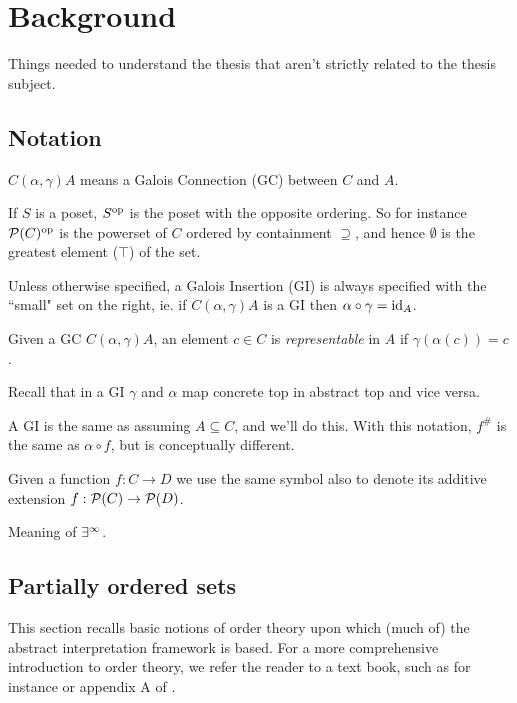 \chapter{Background}

Things needed to understand the thesis that aren't strictly related to the thesis subject.

\section{Notation}
$C (\alpha, \gamma) A$ means a Galois Connection (GC) between $C$ and $A$.

If $S$ is a poset, $S^{\text{op}}$ is the poset with the opposite ordering. So for instance $\mathcal{P}(C)^{\text{op}}$ is the powerset of $C$ ordered by containment $\supseteq$, and hence $\emptyset$ is the greatest element ($\top$) of the set.

Unless otherwise specified, a Galois Insertion (GI) is always specified with the ``small" set on the right, ie. if $C (\alpha, \gamma) A$ is a GI then $\alpha \circ \gamma = \text{id}_A$.

Given a GC $C (\alpha, \gamma) A$, an element $c \in C$ is \textit{representable} in $A$ if $\gamma(\alpha(c)) = c$.


Recall that in a GI $\gamma$ and $\alpha$ map concrete top in abstract top and vice versa.

A GI is the same as assuming $A \subseteq C$, and we'll do this. With this notation, $f^{\#}$ is the same as $\alpha \circ f$, but is conceptually different.

Given a function $f : C \rightarrow D$ we use the same symbol also to denote its additive extension $f: \mathcal{P}(C) \rightarrow \mathcal{P}(D)$.

Meaning of $\exists^{\infty}$.

\section{Partially ordered sets}
This section recalls basic notions of order theory upon which (much of) the abstract interpretation framework is based. For a more comprehensive introduction to order theory, we refer the reader to a text book, such as for instance \cite{order-theory-book} or appendix A of \cite{principles-of-program-analysis-book}.


